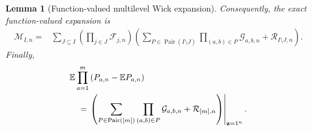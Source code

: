 \documentclass[11pt]{amsart}
\theoremstyle{plain}
\newtheorem{lemma}[theorem]{Lemma}
\numberwithin{equation}{section}
\numberwithin{theorem}{section}
\numberwithin{figure}{section}
\begin{document}
\begin{lemma}[Function-valued multilevel Wick expansion]
Consequently, the exact function-valued expansion is
\begin{align}
    \mathcal M_{I,n}
    ={}&
    \sum_{J\subseteq I}
    \left(\prod_{j\in J}\mathcal F_{j,n}\right)
    \left(
        \sum_{P\in\operatorname{Pair}(I\setminus J)}
        \prod_{(a,b)\in P}\mathcal G_{a,b,n}
        +\mathcal R_{I\setminus J,n}
    \right).
    \label{eq:raw-function-valued-wick}
\end{align}
Finally,
\begin{align}
&\mathbb E
\prod_{a=1}^{m}
\left(
    P_{a,n}-\mathbb E P_{a,n}
\right)
\notag\\
&\quad=
\left.
\left(
    \sum_{P\in\operatorname{Pair}([m])}
    \prod_{(a,b)\in P}\mathcal G_{a,b,n}
    +\mathcal R_{[m],n}
\right)
\right|_{\mathbf z=1^n}.
\label{eq:centered-wick-expansion}
\end{align}
\end{lemma}
\end{document}
